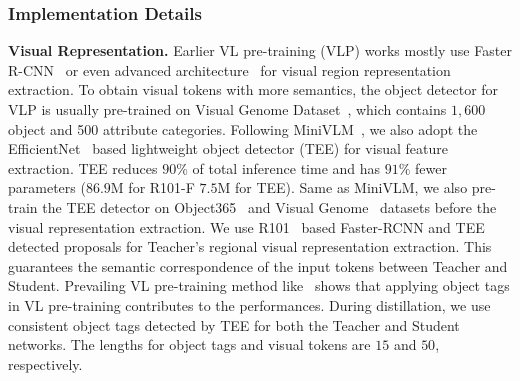 \subsubsection{Implementation Details}
\noindent \textbf{Visual Representation.} Earlier VL pre-training (VLP) works mostly use Faster R-CNN~\cite{anderson2018bottom, ren2015faster} or even advanced architecture~\cite{xie2017aggregated,zhou2020unified} for visual region representation extraction. To obtain visual tokens with more semantics, the object detector for VLP is usually pre-trained on Visual Genome Dataset~\cite{krishna2017visual}, which contains $1,600$ object and 500 attribute categories.
Following MiniVLM~\cite{wang2020minivlm}, we also adopt the EfficientNet~\cite{tan2020efficientdet} based lightweight object detector (TEE) for visual feature extraction. TEE reduces $90\%$ of total inference time and has $91\%$ fewer parameters ($86.9$M for R101-F \vs $7.5$M for TEE). 
Same as MiniVLM, we also pre-train the TEE detector on Object365~\cite{shao2019objects365} and Visual Genome~\cite{krishna2017visual} datasets before the visual representation extraction.
We use R101~\cite{he2016deep} based Faster-RCNN and TEE detected proposals for Teacher's regional visual representation extraction. This guarantees the semantic correspondence of the input tokens between Teacher and Student. 
Prevailing VL pre-training method like~\cite{li2020oscar} shows that applying object tags in VL pre-training contributes to the performances.
During distillation, we use consistent object tags detected by TEE for both the Teacher and Student networks. The lengths for object tags and visual tokens are $15$ and $50$, respectively. \\[-1.6ex]

